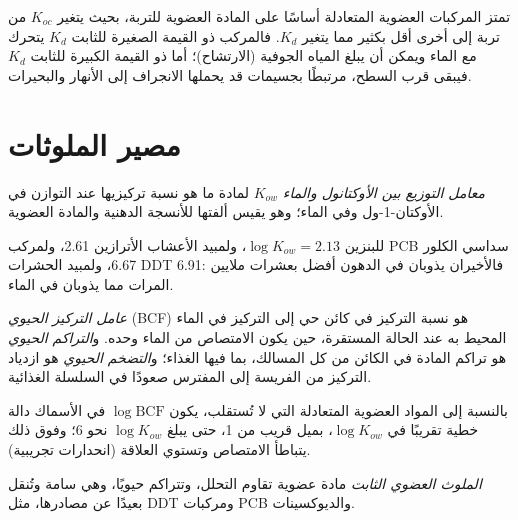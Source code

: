 تمتز المركبات العضوية المتعادلة أساسًا على المادة العضوية للتربة، بحيث يتغير $K_{oc}$
من تربة إلى أخرى أقل بكثير مما يتغير $K_d$. فالمركب ذو القيمة الصغيرة للثابت $K_d$ يتحرك مع الماء
ويمكن أن يبلغ المياه الجوفية (الارتشاح)؛ أما ذو القيمة الكبيرة للثابت $K_d$ فيبقى قرب السطح،
مرتبطًا بجسيمات قد يحملها الانجراف إلى الأنهار والبحيرات.

\section{مصير الملوثات}

\begin{definition}\label{def:b3:environmental-toxicology:kow}
\emph{معامل التوزيع بين الأوكتانول والماء}
$K_{ow}$ لمادة ما هو نسبة تركيزيها عند التوازن في
الأوكتان-1-ول وفي الماء؛ وهو يقيس ألفتها للأنسجة الدهنية والمادة
العضوية.
\end{definition}

للبنزين $\log K_{ow} = 2.13$، ولمبيد الأعشاب الأترازين 2.61، ولمركب PCB سداسي الكلور 6.67،
ولمبيد الحشرات DDT 6.91: فالأخيران يذوبان في الدهون أفضل بعشرات ملايين المرات مما يذوبان في
الماء.

\begin{definition}\label{def:b3:environmental-toxicology:bio}
\emph{عامل التركيز الحيوي} (BCF) هو
نسبة التركيز في كائن حي إلى التركيز في الماء المحيط به عند
الحالة المستقرة، حين يكون الامتصاص من الماء وحده. و\emph{التراكم الحيوي}
هو تراكم المادة في الكائن من كل المسالك، بما فيها الغذاء؛
و\emph{التضخم الحيوي} هو ازدياد
التركيز من الفريسة إلى المفترس صعودًا في السلسلة الغذائية.
\end{definition}

\begin{proposition}\label{prop:b3:environmental-toxicology:bcf-kow}
بالنسبة إلى المواد العضوية المتعادلة التي لا تُستقلب، يكون $\log\mathrm{BCF}$ في الأسماك
دالة خطية تقريبًا في $\log K_{ow}$، بميل قريب من 1، حتى يبلغ $\log K_{ow}$ نحو 6؛
وفوق ذلك يتباطأ الامتصاص وتستوي العلاقة (انحدارات تجريبية).
\admitted
\end{proposition}

\begin{definition}\label{def:b3:environmental-toxicology:pop}
\emph{الملوث العضوي الثابت}
مادة عضوية تقاوم التحلل، وتتراكم حيويًا، وهي سامة
وتُنقل بعيدًا عن مصادرها، مثل DDT ومركبات PCB والديوكسينات.
\end{definition}

